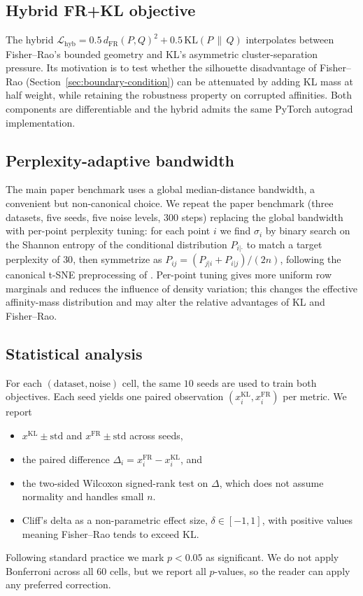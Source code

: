 \documentclass[11pt]{article}
\begin{document}
\subsection{Hybrid FR+KL objective}
\label{sec:hybrid-method}

The hybrid $\mathcal{L}_{\mathrm{hyb}} = 0.5\,d_{\mathrm{FR}}(P,Q)^2 + 0.5\,\mathrm{KL}(P\,\|\,Q)$
interpolates between Fisher--Rao's bounded geometry and KL's asymmetric cluster-separation
pressure. Its motivation is to test whether the silhouette disadvantage of Fisher--Rao
(Section~\ref{sec:boundary-condition}) can be attenuated by adding KL mass at half weight,
while retaining the robustness property on corrupted affinities. Both components are
differentiable and the hybrid admits the same PyTorch autograd implementation.

\subsection{Perplexity-adaptive bandwidth}
\label{sec:perplexity-method}

The main paper benchmark uses a global median-distance bandwidth, a convenient but
non-canonical choice. We repeat the paper benchmark (three datasets, five seeds, five noise
levels, $300$ steps) replacing the global bandwidth with per-point perplexity tuning: for each
point $i$ we find $\sigma_i$ by binary search on the Shannon entropy of the conditional
distribution $P_{i|\cdot}$ to match a target perplexity of $30$, then symmetrize as
$P_{ij}=(P_{j|i}+P_{i|j})/(2n)$, following the canonical t-SNE preprocessing of
\citet{maaten2008visualizing}. Per-point tuning gives more uniform row marginals and reduces
the influence of density variation; this changes the effective affinity-mass distribution and
may alter the relative advantages of KL and Fisher--Rao.

\subsection{Statistical analysis}
\label{sec:stats}

For each $(\text{dataset},\text{noise})$ cell, the same $10$ seeds are used to train both
objectives. Each seed yields one paired observation $(x_i^{\mathrm{KL}},x_i^{\mathrm{FR}})$ per
metric. We report
\begin{itemize}
  \item $x^{\mathrm{KL}}\pm \mathrm{std}$ and $x^{\mathrm{FR}}\pm \mathrm{std}$ across seeds,
  \item the paired difference $\Delta_i = x_i^{\mathrm{FR}} - x_i^{\mathrm{KL}}$, and
  \item the two-sided Wilcoxon signed-rank test \citep{wilcoxon1945individual} on $\Delta$,
        which does not assume normality and handles small $n$.
  \item Cliff's delta \citep{cliff1993dominance} as a non-parametric effect size,
        $\delta\in[-1,1]$, with positive values meaning Fisher--Rao tends to exceed KL.
\end{itemize}
Following standard practice we mark $p<0.05$ as significant. We do not apply Bonferroni
across all $60$ cells, but we report all $p$-values, so the reader can apply any preferred
correction.
\end{document}
